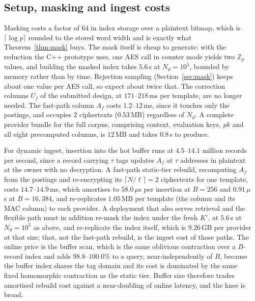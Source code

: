 \documentclass[a4paper,fleqn]{cas-dc}
\newif\ifauthorchecks
\newcommand{\authorcheck}[1]{\ifauthorchecks{\color{red}\textsf{[Authors: #1]}}\fi}
\begin{document}
\subsection{Setup, masking and ingest costs}
\label{sec:setupresult}
Masking costs a factor of $64$ in index storage over a plaintext bitmap, which
is $\lceil\log p\rceil$ rounded to the stored word width and is exactly what
Theorem~\ref{thm:mask} buys. The mask itself is cheap to generate: with the
reduction the C++ prototype uses, one AES call in counter mode yields two
$\mathbb{Z}_p$ values, and building the masked index takes $5.6$\,s at
$N_d=10^5$, bounded by memory rather than by time. Rejection sampling
(Section~\ref{sec:mask}) keeps about one value per AES call, so expect about
twice that. \authorcheck{Re-measure the masked-index build with rejection
sampling in C++.} The correction columns $U_f$ of the submitted design, at
$171$--$218$\,ms per template, are no longer needed. The fast-path column
$A_f$ costs $1.2$--$12$\,ms, since it touches only the postings, and occupies $2$
ciphertexts ($0.53$\,MB) regardless of $N_d$. A complete provider bundle for
the full corpus, comprising context, evaluation keys, $pk$ and all eight
precomputed columns, is $12$\,MB and takes $0.8$\,s to produce.

For dynamic ingest, insertion into the hot buffer runs at $4.5$--$14.1$
million records per second, since a record carrying $\tau$ tags updates $A_f$
at $\tau$ addresses in plaintext at the owner with no decryption. A fast-path
static-tier rebuild, recomputing $A_f$ from the postings and re-encrypting its
$\lceil N/\ell\rceil=2$ ciphertexts for one template, costs
$14.7$--$14.9$\,ms, which amortises to $58.0\,\mu$s per insertion at $B=256$
and $0.91\,\mu$s at $B=16{,}384$, and re-replicates $1.05$\,MB per template
(the column and its MAC column) to each provider. A deployment that also
serves retrieval and the flexible path must in addition re-mask the index
under the fresh $K'$, at $5.6$\,s at $N_d=10^5$ as above, and re-replicate the
index itself, which is $9.26$\,GB per provider at that size; that, not the
fast-path rebuild, is the ingest cost of those paths. The online price is the buffer scan, which is the
same oblivious contraction over a $B$-record index and adds
$98.8$--$100.0\%$ to a query, near-independently of $B$, because the buffer
index shares the tag domain and its cost is dominated by the same fixed
homomorphic contraction as the static tier. Buffer size therefore trades
amortised rebuild cost against a near-doubling of online latency, and the knee
is broad.
\end{document}
